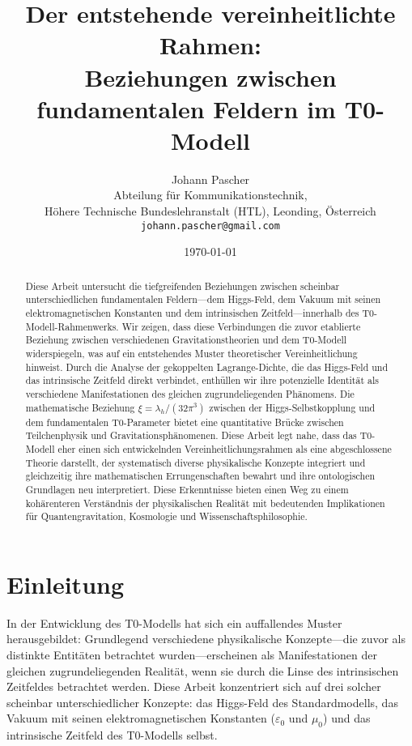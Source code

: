 \documentclass[12pt,a4paper]{article}
\begin{document}
	
	\title{Der entstehende vereinheitlichte Rahmen:\\Beziehungen zwischen fundamentalen Feldern im T0-Modell}
	\author{Johann Pascher\\
		Abteilung für Kommunikationstechnik, \\Höhere Technische Bundeslehranstalt (HTL), Leonding, Österreich\\
		\texttt{johann.pascher@gmail.com}}
	\date{\today}
	
	\maketitle
	
	\begin{abstract}
		Diese Arbeit untersucht die tiefgreifenden Beziehungen zwischen scheinbar unterschiedlichen fundamentalen Feldern—dem Higgs-Feld, dem Vakuum mit seinen elektromagnetischen Konstanten und dem intrinsischen Zeitfeld—innerhalb des T0-Modell-Rahmenwerks. Wir zeigen, dass diese Verbindungen die zuvor etablierte Beziehung zwischen verschiedenen Gravitationstheorien und dem T0-Modell widerspiegeln, was auf ein entstehendes Muster theoretischer Vereinheitlichung hinweist. Durch die Analyse der gekoppelten Lagrange-Dichte, die das Higgs-Feld und das intrinsische Zeitfeld direkt verbindet, enthüllen wir ihre potenzielle Identität als verschiedene Manifestationen des gleichen zugrundeliegenden Phänomens. Die mathematische Beziehung $\xi = \lambda_h/(32\pi^3)$ zwischen der Higgs-Selbstkopplung und dem fundamentalen T0-Parameter bietet eine quantitative Brücke zwischen Teilchenphysik und Gravitationsphänomenen. Diese Arbeit legt nahe, dass das T0-Modell eher einen sich entwickelnden Vereinheitlichungsrahmen als eine abgeschlossene Theorie darstellt, der systematisch diverse physikalische Konzepte integriert und gleichzeitig ihre mathematischen Errungenschaften bewahrt und ihre ontologischen Grundlagen neu interpretiert. Diese Erkenntnisse bieten einen Weg zu einem kohärenteren Verständnis der physikalischen Realität mit bedeutenden Implikationen für Quantengravitation, Kosmologie und Wissenschaftsphilosophie.
	\end{abstract}
	\newpage
	\tableofcontents
	\newpage
	\section{Einleitung}
	\label{sec:introduction}
	
	In der Entwicklung des T0-Modells hat sich ein auffallendes Muster herausgebildet: Grundlegend verschiedene physikalische Konzepte—die zuvor als distinkte Entitäten betrachtet wurden—erscheinen als Manifestationen der gleichen zugrundeliegenden Realität, wenn sie durch die Linse des intrinsischen Zeitfeldes betrachtet werden. Diese Arbeit konzentriert sich auf drei solcher scheinbar unterschiedlicher Konzepte: das Higgs-Feld des Standardmodells, das Vakuum mit seinen elektromagnetischen Konstanten ($\varepsilon_0$ und $\mu_0$) und das intrinsische Zeitfeld des T0-Modells selbst.
	
\end{document}
